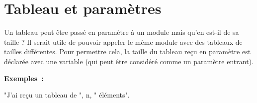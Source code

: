 

	

\section{Tableau et paramètres}

	Un tableau peut être passé en paramètre à un module mais qu’en est-il de
	sa taille ? Il serait utile de pouvoir appeler le même module avec des
	tableaux de tailles différentes. Pour permettre cela, la taille du
	tableau reçu en paramètre est déclarée avec une variable (qui peut être
	considéré comme un paramètre entrant).

	\textbf{Exemples~:}
	
	\begin{Pseudocode}
		\Write "J’ai reçu un tableau de ", n, " éléments".
	\EndModule
	\end{Pseudocode}

